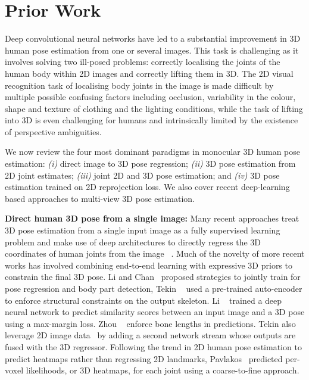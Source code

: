 \documentclass[10pt,twocolumn,letterpaper]{article}
\begin{document}
\section{Prior Work}



Deep convolutional neural networks have led to a substantial
improvement in 3D human pose estimation from one or several
images. This task is challenging as it involves solving two ill-posed
problems: correctly localising the joints of the human body within 2D
images and correctly lifting them in 3D. The 2D visual recognition
task of localising body joints in the image is made difficult by
multiple possible confusing factors including occlusion, variability
in the colour, shape and texture of clothing and the lighting
conditions, while the task of lifting into 3D is even challenging for
humans and intrinsically limited by the existence of perspective
ambiguities.




We now review the four most dominant paradigms in monocular 3D human pose
estimation: \emph{(i)} direct image to 3D pose regression; \emph{(ii)}
3D pose estimation from 2D joint estimates; \emph{(iii)} joint 2D and
3D pose estimation; and \emph{(iv)} 3D pose estimation trained on 2D
reprojection loss. We  also cover recent deep-learning based approaches to
multi-view 3D pose estimation. 

{\bf Direct human 3D pose from a single image:}
Many recent approaches treat 3D pose estimation from a single input image as a
fully supervised learning problem and make use of deep architectures to directly
regress the 3D coordinates of human joints from the image
~\cite{li20143D,park20163D,tekin2016structured,zhou2016deep}. Much of the
novelty of more recent works has involved combining end-to-end learning with
expressive 3D priors to constrain the final 3D pose. Li and Chan~\cite{li20143D}
proposed strategies to jointly train for pose regression and body part
detection, Tekin \etal~\cite{tekin2016structured} used a pre-trained
auto-encoder to enforce structural constraints on the output skeleton. Li
\etal~\cite{li2015maximum} trained a deep neural network to predict
similarity scores between an input image and a 3D pose using a max-margin loss.
Zhou \etal~\cite{zhou2016deep} enforce bone lengths in predictions. Tekin
\etal also leverage 2D image data~\cite{tekin2017learning} by adding a
second network stream whose outputs are fused with the 3D regressor. Following
the trend in 2D human pose estimation to predict heatmaps rather than regressing
2D landmarks, Pavlakos~\cite{pavlakos2017coarse} predicted per-voxel likelihoods,
or 3D heatmaps, for each joint using a coarse-to-fine approach.
\end{document}
